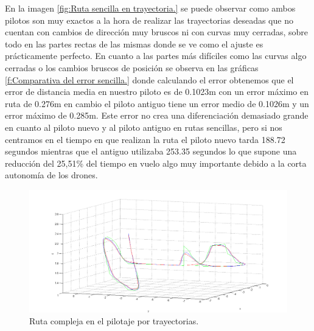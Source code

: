 \hspace{1cm} En la imagen \ref{fig:Ruta sencilla en trayectoria.} se puede observar como ambos pilotos son muy exactos a la hora de realizar las trayectorias deseadas que no cuentan con cambios de dirección muy bruscos ni con curvas muy cerradas, sobre todo en las partes rectas de las mismas donde se ve como el ajuste es prácticamente perfecto. En cuanto a las partes más difíciles como las curvas algo cerradas o los cambios bruscos de posición se observa en las gráficas \ref{f:Comparativa del error sencilla.} donde calculando el error obtenemos que el error de distancia media en nuestro piloto es de 0.1023m con un error máximo en ruta de 0.276m en cambio el piloto antiguo tiene un error medio de 0.1026m y un error máximo de 0.285m. Este error no crea una diferenciación demasiado grande en cuanto al piloto nuevo y al piloto antiguo en rutas sencillas, pero si nos centramos en el tiempo en que realizan la ruta el piloto nuevo tarda 188.72 segundos mientras que el antiguo utilizaba 253.35 segundos lo que supone una reducción del 25,51\% del tiempo en vuelo algo muy importante debido a la corta autonomía de los drones.

\begin{figure}[H]
	\begin{center}
		\includegraphics[width=1\textwidth]{imag/IMG41.png}
				\caption{Ruta compleja en el pilotaje por trayectorias.}
		\label{fig:Ruta compleja en trayectoria.}	
	\end{center}
\end{figure}

